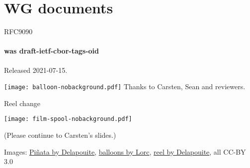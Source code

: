 \documentclass[aspectratio=169]{beamer}
\begin{document}
\section*{WG documents}

\begin{frame}{RFC9090}\Large
	\framesubtitle{was draft-ietf-cbor-tags-oid}

	Released 2021-07-15.

	\begin{block}{\texttt{[image: balloon-nobackground.pdf]}\mbox{\quad}}
		Thanks to Carsten, Sean and reviewers.
	\end{block}
\end{frame}

\begin{frame}{Reel change}
	\begin{block}{\texttt{[image: film-spool-nobackground.pdf]}\mbox{\quad}}
		\mbox{}

		\vspace{-1.7cm}

		(Please continue to Carsten's slides.)
	\end{block}

	\vfill
	\tiny Images:
	\href{https://game-icons.net/1x1/delapouite/pinata.html}{Piñata by Delapouite},
	\href{https://game-icons.net/1x1/lorc/balloons.html}{balloons by Lorc},
	\href{https://game-icons.net/1x1/delapouite/film-spool.html}{reel by Delapouite}, all CC-BY 3.0
\end{frame}
\end{document}
